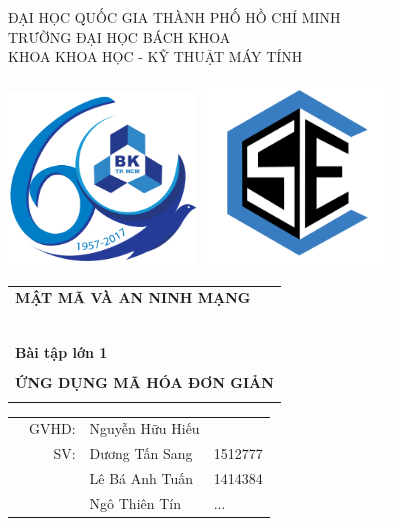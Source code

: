 \documentclass[a4paper]{article}
\begin{document}
\begin{titlepage}
\begin{center}
ĐẠI HỌC QUỐC GIA THÀNH PHỐ HỒ CHÍ MINH \\
TRƯỜNG ĐẠI HỌC BÁCH KHOA \\
KHOA KHOA HỌC - KỸ THUẬT MÁY TÍNH 
\end{center}

\vspace{1cm}

\includegraphics[width=5cm]{hcmut.png}
\hfill
\includegraphics[width=5cm]{cse.png}

\vspace{1cm}


\begin{center}
\begin{tabular}{c}
\multicolumn{1}{l}{\textbf{{\Large MẬT MÃ VÀ AN NINH MẠNG}}}\\
~~\\
\hline
\\
\multicolumn{1}{l}{\textbf{{\Large Bài tập lớn 1}}}\\
\\
\textbf{{\Huge ỨNG DỤNG MÃ HÓA ĐƠN GIẢN}}\\
\\
\hline
\end{tabular}
\end{center}

\vspace{3cm}

\begin{center}
\begin{table}[h]
\begin{tabular}{rrll}
\hspace{5 cm} & GVHD: & Nguyễn Hữu Hiếu&\\
& SV: & Dương Tấn Sang &1512777\\
&&Lê Bá Anh Tuấn &1414384\\
&&Ngô Thiên Tín&...
\end{tabular}
\end{table}
\end{center}


\end{titlepage}
\end{document}

